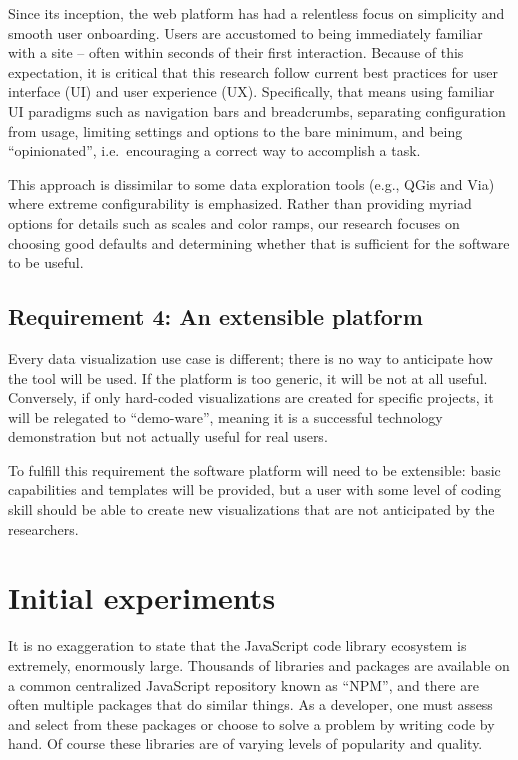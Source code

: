 Since its inception, the web platform has had a relentless focus on simplicity and smooth user onboarding. Users are accustomed to being immediately familiar with a site -- often within seconds of their first interaction. Because of this expectation, it is critical that this research follow current best practices for user interface (UI) and user experience (UX). Specifically, that means using familiar UI paradigms such as navigation bars and breadcrumbs, separating configuration from usage, limiting settings and options to the bare minimum, and being ``opinionated'', i.e.~encouraging a correct way to accomplish a task.

This approach is dissimilar to some data exploration tools (e.g., QGis and Via) where extreme configurability is emphasized. Rather than providing myriad options for details such as scales and color ramps, our research focuses on choosing good defaults and determining whether that is sufficient for the software to be useful.

\hypertarget{requirement-4-an-extensible-platform}{%
\subsection{Requirement 4: An extensible platform}\label{requirement-4-an-extensible-platform}}

Every data visualization use case is different; there is no way to anticipate how the tool will be used. If the platform is too generic, it will be not at all useful. Conversely, if only hard-coded visualizations are created for specific projects, it will be relegated to ``demo-ware'', meaning it is a successful technology demonstration but not actually useful for real users.

To fulfill this requirement the software platform will need to be extensible: basic capabilities and templates will be provided, but a user with some level of coding skill should be able to create new visualizations that are not anticipated by the researchers.

\hypertarget{mathub-initial-experiments}{%
\section{Initial experiments}\label{initial-experiments}}

It is no exaggeration to state that the JavaScript code library ecosystem is extremely, enormously large. Thousands of libraries and packages are available on a common centralized JavaScript repository known as ``NPM'', and there are often multiple packages that do similar things. As a developer, one must assess and select from these packages or choose to solve a problem by writing code by hand. Of course these libraries are of varying levels of popularity and quality.

